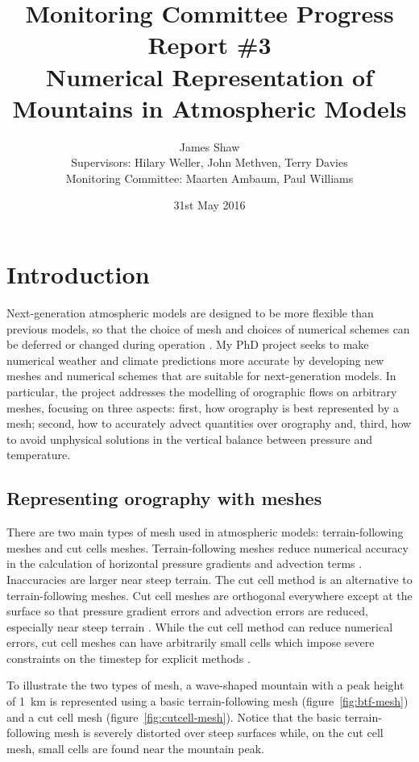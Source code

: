 \documentclass[a4paper,11pt]{article}
\title{Monitoring Committee Progress Report \#3\\
\vspace*{1em}
\Large{Numerical Representation of Mountains in Atmospheric Models}}
\author{James Shaw
\vspace{0.5em} \\
\large{Supervisors: Hilary Weller, John Methven, Terry Davies}
\vspace{0.5em} \\
\large{Monitoring Committee: Maarten Ambaum, Paul Williams}}
\date{31st May 2016}
\begin{document}
\newcommand{\exner}{\Pi}
\maketitle

\section{Introduction}

Next-generation atmospheric models are designed to be more flexible than previous models, so that the choice of mesh and choices of numerical schemes can be deferred or changed during operation \citep{ford2013,theurich2015}.
My PhD project seeks to make numerical weather and climate predictions more accurate by developing new meshes and numerical schemes that are suitable for next-generation models.
In particular, the project addresses the modelling of orographic flows on arbitrary meshes, focusing on three aspects: first, how orography is best represented by a mesh; second, how to accurately advect quantities over orography and, third, how to avoid unphysical solutions in the vertical balance between pressure and temperature.

\subsection*{Representing orography with meshes}

There are two main types of mesh used in atmospheric models: terrain-following meshes and cut cells meshes.
Terrain-following meshes reduce numerical accuracy in the calculation of horizontal pressure gradients \citep{gary1973,zaengl2012} and advection terms \citep{schaer2002}.  Inaccuracies are larger near steep terrain.
The cut cell method is an alternative to terrain-following meshes.  Cut cell meshes are orthogonal everywhere except at the surface so that pressure gradient errors and advection errors are reduced, especially near steep terrain \citep{lock2012,good2014}.  While the cut cell method can reduce numerical errors, cut cell meshes can have arbitrarily small cells which impose severe constraints on the timestep for explicit methods \citep{almgren1997}.

To illustrate the two types of mesh, a wave-shaped mountain with a peak height of \SI{1}{\kilo\meter} is represented using a basic terrain-following mesh (figure~\ref{fig:btf-mesh}) and a cut cell mesh (figure~\ref{fig:cutcell-mesh}).  Notice that the basic terrain-following mesh is severely distorted over steep surfaces while, on the cut cell mesh, small cells are found near the mountain peak.
\end{document}
